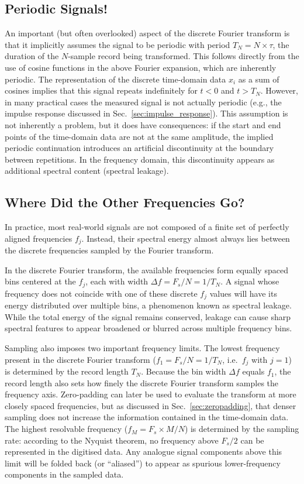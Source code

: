 \documentclass[12pt,a4paper]{article}
\providecommand{\seclabel}[1]{\label{sec:#1}}
\providecommand{\secn}[1]{Sec.~\ref{sec:#1}}
\begin{document}
\subsection{Periodic Signals!}\seclabel{Fourier_periodic}
An important (but often overlooked) aspect of the discrete Fourier transform is that it implicitly assumes the signal to be periodic with period $T_N = N \times \tau$, the duration of the $N$-sample record being transformed.  
This follows directly from the use of cosine functions in the above Fourier expansion, which are inherently periodic. The representation of the discrete time-domain data $x_i$ as a sum of cosines implies that this signal repeats indefinitely for $t < 0$ and $t > T_N$.  
However, in many practical cases the measured signal is not actually periodic (e.g., the impulse response discussed in \secn{impulse_response}). This assumption is not inherently a problem, but it does have consequences: if the start and end points of the time-domain data are not at the same amplitude, the implied periodic continuation introduces an artificial discontinuity at the boundary between repetitions. In the frequency domain, this discontinuity appears as additional spectral content (spectral leakage).

\subsection{Where Did the Other Frequencies Go?}
In practice, most real-world signals are not composed of a finite set of perfectly aligned frequencies $f_j$.  
Instead, their spectral energy almost always lies between the discrete frequencies sampled by the Fourier transform.

In the discrete Fourier transform, the available frequencies form equally spaced bins centered at the $f_j$, each with width $\Delta f = F_s/N = 1/T_N$.
A signal whose frequency does not coincide with one of these discrete $f_j$ values will have its energy distributed over multiple bins, a phenomenon known as spectral leakage. While the total energy of the signal remains conserved, leakage can cause sharp spectral features to appear broadened or blurred across multiple frequency bins.

Sampling also imposes two important frequency limits.  
The lowest frequency present in the discrete Fourier transform ($f_1 = F_s/N = 1/T_N$, i.e.\ $f_j$ with $j = 1$) is determined by the record length $T_N$.  
Because the bin width $\Delta f$ equals $f_1$, the record length also sets how finely the discrete Fourier transform samples the frequency axis.
Zero-padding can later be used to evaluate the transform at more closely spaced frequencies, but as discussed in \secn{zeropadding}, that denser sampling does not increase the information contained in the time-domain data.
The highest resolvable frequency ($f_M = F_s \times M / N$) is determined by the sampling rate: according to the Nyquist theorem, no frequency above $F_s/2$ can be represented in the digitised data.  
Any analogue signal components above this limit will be folded back (or ``aliased'') to appear as spurious lower-frequency components in the sampled data.
\end{document}
